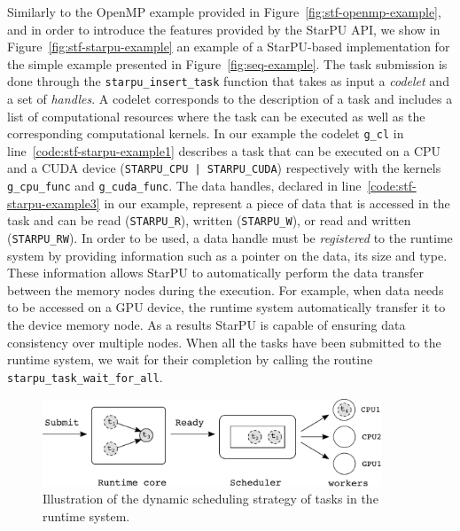 \documentclass{article}
\newcommand{\openmp}{OpenMP\xspace}
\begin{document}
Similarly to the \openmp example provided in
Figure~\ref{fig:stf-openmp-example}, and in order to introduce the
features provided by the StarPU API, we show in
Figure~\ref{fig:stf-starpu-example} an example of a StarPU-based
implementation for the simple example presented in
Figure~\ref{fig:seq-example}. The task submission is done through the
\texttt{starpu\_insert\_task} function that takes as input a
\textit{codelet} and a set of \textit{handles}. A codelet corresponds
to the description of a task and includes a list of computational
resources where the task can be executed as well as the corresponding
computational kernels. In our example the codelet \texttt{g\_cl} in
line~\ref{code:stf-starpu-example1} describes a task that can be
executed on a CPU and a CUDA device (\texttt{STARPU\_CPU |
  STARPU\_CUDA}) respectively with the kernels \texttt{g\_cpu\_func}
and \texttt{g\_cuda\_func}. The data handles, declared in
line~\ref{code:stf-starpu-example3} in our example, represent a piece
of data that is accessed in the task and can be read
(\texttt{STARPU\_R}), written (\texttt{STARPU\_W}), or read and
written (\texttt{STARPU\_RW}). In order to be used, a data handle must
be \textit{registered} to the runtime system by providing information
such as a pointer on the data, its size and type. These information
allows StarPU to automatically perform the data transfer between the
memory nodes during the execution. For example, when data needs to be
accessed on a GPU device, the runtime system automatically transfer it
to the device memory node. As a results StarPU is capable of ensuring
data consistency over multiple nodes. When all the tasks have been
submitted to the runtime system, we wait for their completion by
calling the routine \texttt{starpu\_task\_wait\_for\_all}.

\begin{figure}[!h]
    \centering
    \includegraphics[width=0.9\textwidth]{figures/scheduler}
    \caption{\label{fig:scheduler} Illustration of the dynamic
      scheduling strategy of tasks in the runtime system.}
\end{figure}
\end{document}
